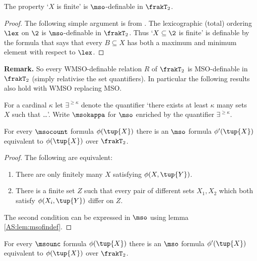
\begin{lemma} \label{AS:lem:msofindef}
The property `$X$ is finite' is $\mso$-definable in $\frakT_2$.
\end{lemma}

\begin{proof}
The following simple argument is from \cite{Rabi69}.
The lexicographic (total) ordering $\lex$ on $\2$ is $\mso$-definable in $\frakT_2$.
Thus `$X \subseteq \2$ is finite' is definable by the formula that says that every $B \subseteq X$ has
both a maximum and minimum element with respect to $\lex$.
\end{proof}

{\bf Remark.} So every WMSO-definable relation $R$ of $\frakT_2$ is MSO-definable in $\frakT_2$ 
(simply relativise the set quantifiers). In particular the following results also hold with WMSO replacing MSO.

For a cardinal $\kappa$ let $\exists^{\geq \kappa}$ denote the quantifier `there exists at least $\kappa$ many sets $X$ such that \dots'.
Write $\msokappa$ for $\mso$ enriched by the quantifier $\exists^{\geq \kappa}$. 

\begin{proposition} \cite{BKRa}
For every $\msocount$ formula $\phi(\tup{X})$ there is an $\mso$ formula 
$\phi'(\tup{X})$ equivalent to $\phi(\tup{X})$ over $\frakT_2$.
\end{proposition}

\begin{proof}
The following are equivalent:
\begin{enumerate}
\item There are only finitely many $X$ satisfying $\phi(X,\tup{Y})$. 
\item There is a finite set $Z$ such that every pair of different sets $X_1,X_2$ which both satisfy $\phi(X_i,\tup{Y})$ differ on $Z$.
\end{enumerate}
The second condition can be expressed in $\mso$ using lemma \ref{AS:lem:msofindef}.
\end{proof}

\begin{theorem} \cite{BKRa}
For every $\msounc$ formula $\phi(\tup{X})$ there is an $\mso$ formula
$\phi'(\tup{X})$ equivalent to $\phi(\tup{X})$ over $\frakT_2$.
\end{theorem}

